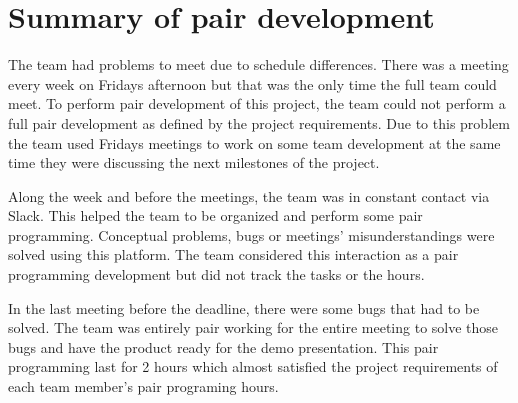 
\section{Summary of pair development}
The team had problems to meet due to schedule differences. There was a meeting every week on Fridays afternoon but that was the only time the full team could meet. To perform pair development of this project, the team could not perform a full pair development as defined by the project requirements. Due to this problem the team used Fridays meetings to work on some team development at the same time they were discussing the next milestones of the project.

Along the week and before the meetings, the team was in constant contact via Slack. This helped the team to be organized and perform some pair programming. Conceptual problems, bugs or meetings' misunderstandings were solved using this platform. The team considered this interaction as a pair programming development but did not track the tasks or the hours.

In the last meeting before the deadline, there were some bugs that had to be solved. The team was entirely pair working for the entire meeting to solve those bugs and have the product ready for the demo presentation. This pair programming last for 2 hours which almost satisfied the project requirements of each team member's pair programing hours.